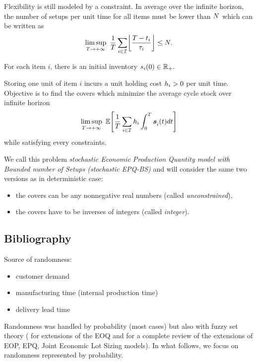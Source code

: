Flexibility is still modeled by a constraint.
In average over the infinite horizon, the number of setups per unit time for all items must be lower than $N$ which can be written as
\begin{equation}
  \limsup_{\horizon\rightarrow+\infty}\ \frac{1}{\horizon} \sum_{i\in\REF} \left\lfloor\frac{\horizon-t_i}{\cover_i}\right\rfloor \le \nbsetups.
\end{equation}

For each item $i$, there is an initial inventory $s_i\bracket{0}\in\RR_+$.


Storing one unit of item $i$ incurs a unit holding cost $h_i>0$ per unit time.
Objective is to find the covers which minimize the average cycle stock over infinite horizon
\begin{equation}
  \limsup_{\horizon\rightarrow+\infty}
  \ 
  \espe\sqbracket{
  \frac{1}{\horizon} \sum_{i\in\REF} \holding_i \int_0^{\horizon}\va\inventory_i\bracket{t}dt
  }
\end{equation}
while satisfying every constraints.


We call this problem \emph{stochastic Economic Production Quantity model with Bounded number of Setups (stochastic EPQ-BS)} and will consider the same two versions as in deterministic case:
\begin{itemize}
  \item the covers can be any nonnegative real numbers (called \emph{unconstrained}),
  \item the covers have to be inverses of integers (called \emph{integer}).
\end{itemize}



\subsection{Bibliography}

Source of randomness:
\begin{itemize}
  \item customer demand
  \item manufacturing time (internal production time)
  \item delivery lead time
\end{itemize}

Randomness was handled by probability (most cases) but also with fuzzy set theory (\eg \cite{Park1987,Lee1999,Wang2007} for extensions of the EOQ and \cite{Ziukov2015} for a complete review of the extensions of EOP, EPQ, Joint Economic Lot Sizing models).
In what follows, we focus on randomness represented by probability.

